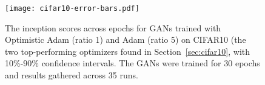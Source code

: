 \begin{figure}[H]
    \centering  
    \texttt{[image: cifar10-error-bars.pdf]}
    \caption{The inception scores across epochs for GANs trained with Optimistic Adam (ratio 1) and Adam (ratio 5) on CIFAR10 (the two top-performing optimizers found in Section~\ref{sec:cifar10}, with 10\%-90\% confidence intervals. The GANs were trained for 30 epochs and results gathered across 35 runs.}\label{fig:optimistic-Adam}
\end{figure}